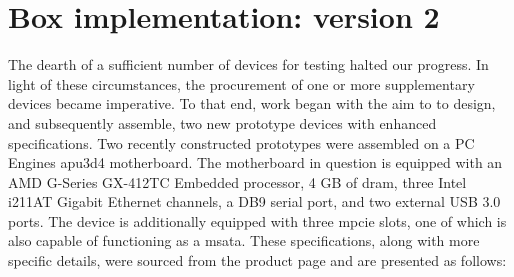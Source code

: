 \section{Box implementation: version 2}
\label{sec:box_v2}

The dearth of a sufficient number of devices for testing halted our progress. In light of these circumstances, the procurement of one or more supplementary devices became imperative. To that end, work began with the aim to to design, and subsequently assemble, two new prototype devices with enhanced specifications.
Two recently constructed prototypes were assembled on a PC Engines apu3d4 motherboard. The motherboard in question is equipped with an AMD G-Series GX-412TC Embedded processor, 4 GB of \gls{dram}, three Intel i211AT Gigabit Ethernet channels, a DB9 serial port, and two external USB 3.0 ports. The device is additionally equipped with three \gls{mpcie} slots, one of which is also capable of functioning as a \gls{msata}. 
These specifications, along with more specific details, were sourced from the product page and are presented as follows:

